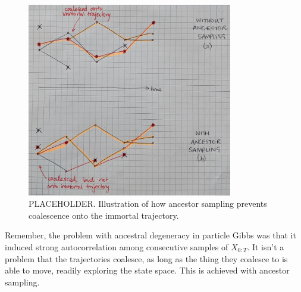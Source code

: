 \begin{figure}
\centering
\includegraphics[width=0.8\textwidth]{plots/ancsampworks.jpg}
\caption{PLACEHOLDER. Illustration of how ancestor sampling prevents coalescence onto the immortal trajectory.}
\label{fig:whyASworks}
\end{figure}

Remember, the problem with ancestral degeneracy in particle Gibbs was that it induced strong autocorrelation among consecutive samples of $X_{0:T}$. It isn't a problem that the trajectories coalesce, as long as the thing they coalesce to is able to move, readily exploring the state space. This is achieved with ancestor sampling.

